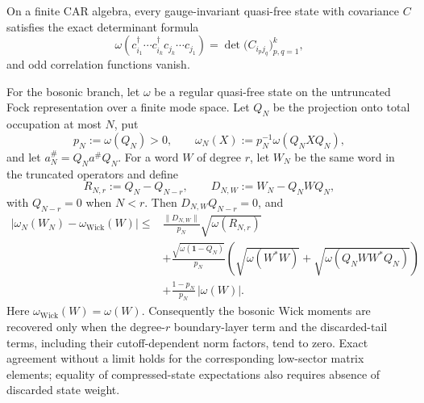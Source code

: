 \documentclass[12pt,a4paper]{article}
\begin{document}
\begin{theorem}
\label{p4:thm:finite-wick-quasifree-calculus}
On a finite CAR algebra, every gauge-invariant quasi-free state with covariance \(C\) satisfies the exact determinant formula
\begin{equation}
\label{p4:eq:finite-fermion-wick-determinant}
\omega\!\left(c_{i_1}^\dagger\cdots c_{i_k}^\dagger c_{j_k}\cdots c_{j_1}\right)
=
\det\bigl(C_{i_pj_q}\bigr)_{p,q=1}^k,
\end{equation}
and odd correlation functions vanish.

For the bosonic branch, let \(\omega\) be a regular quasi-free state on the
untruncated Fock representation over a finite mode space.  Let \(Q_N\) be the
projection onto total occupation at most \(N\), put
\[
p_N:=\omega(Q_N)>0,
\qquad
\omega_N(X):=p_N^{-1}\omega(Q_NXQ_N),
\]
and let \(a_N^\#=Q_Na^\#Q_N\).  For a word \(W\) of degree \(r\), let \(W_N\)
be the same word in the truncated operators and define
\[
R_{N,r}:=Q_N-Q_{N-r},
\qquad
D_{N,W}:=W_N-Q_NWQ_N,
\]
with \(Q_{N-r}=0\) when \(N<r\).  Then \(D_{N,W}Q_{N-r}=0\), and
\begin{equation}
\label{p4:eq:finite-boson-wick-boundary-error}
\begin{aligned}
|\omega_N(W_N)-\omega_{\mathrm{Wick}}(W)|
\le{}&
\frac{\|D_{N,W}\|}{p_N}\sqrt{\omega(R_{N,r})}\\
&+
\frac{\sqrt{\omega(\mathbf1-Q_N)}}{p_N}
\left(
\sqrt{\omega(W^*W)}
+
\sqrt{\omega(Q_NWW^*Q_N)}
\right)\\
&+
\frac{1-p_N}{p_N}\,|\omega(W)|.
\end{aligned}
\end{equation}
Here \(\omega_{\mathrm{Wick}}(W)=\omega(W)\).  Consequently the bosonic Wick
moments are recovered only when the degree-\(r\) boundary-layer term and the
discarded-tail terms, including their cutoff-dependent norm factors, tend
to zero.  Exact agreement without a limit holds for the corresponding
low-sector matrix elements; equality of compressed-state expectations also
requires absence of discarded state weight.
\end{theorem}
\end{document}
